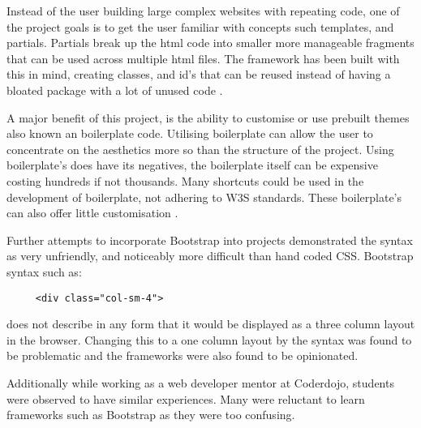 Instead of the user building large complex websites with repeating code, one of the project goals is to get the user familiar with concepts such templates, and partials. Partials break up the html code into smaller more manageable fragments that can be used across multiple html files. The framework has been built with this in mind, creating classes, and id's that can be reused instead of having a bloated package with a lot of unused code \citep{KAR15}.

A major benefit of this project, is the ability to customise or use prebuilt themes also known an boilerplate code. Utilising boilerplate can allow the user to concentrate on the aesthetics more so than the structure of the project. Using boilerplate's does have its negatives, the boilerplate itself can be expensive costing hundreds if not thousands. Many shortcuts could be used in the development of boilerplate, not adhering to W3S standards. These boilerplate's can also offer little customisation \citep{NATH16}.

Further attempts to incorporate Bootstrap into projects demonstrated the syntax as very unfriendly, and noticeably more difficult than hand coded \gls{CSS}. Bootstrap syntax such as: \begin{lstlisting}
	 <div class="col-sm-4">\end{lstlisting} 
	 does not describe in any form that it would be displayed as a three column layout in the browser. Changing this to a one column layout by the syntax was found to be problematic and the frameworks were also found to be opinionated.  
	 
Additionally while working as a web developer mentor at Coderdojo, students were observed to have similar experiences. Many were reluctant to learn frameworks such as Bootstrap as they were too confusing.

%